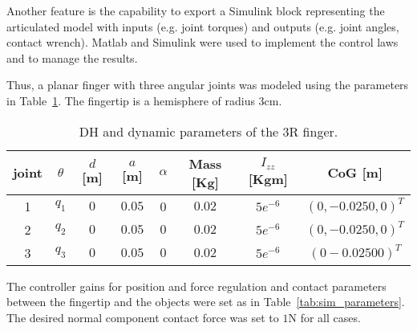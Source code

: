 Another feature is the capability to export a Simulink block representing the articulated model with inputs (e.g. joint torques) and outputs (e.g. joint angles, contact wrench). Matlab and Simulink were used to implement the control laws and to manage the results.

Thus, a planar finger with three angular joints was modeled using the parameters in Table~\ref{tab:3R}. The fingertip is a hemisphere of radius $3$cm.

\begin{table}
\centering
\begin{tabular}{cccccccc}
    \toprule
    \textbf{joint} & $\theta$ & $d$ [m] & $a$ [m] & $\alpha$ & \textbf{Mass [Kg]} & $I_{zz}$ [Kgm] & \textbf{CoG [m]}\\
    \toprule
    1 & $q_1$ & $0$ & $0.05$ & 0 & $0.02$ & $5e^{-6}$ & $(0, -0.0250, 0)^{T}$\\
    \midrule
    2 & $q_2$ & $0$ & $0.05$ & $0$ & $0.02$ & $5e^{-6}$ & $(0, -0.0250, 0)^{T}$\\
    \midrule
    3 & $q_3$ & $0$ & $0.05$ & $0$ & $0.02$ & $5e^{-6}$ & $(0 -0.0250 0)^{T}$\\
    \bottomrule
\end{tabular}
\caption{DH and dynamic parameters of the 3R finger.}
\label{tab:3R}
\end{table}

The controller gains for position and force regulation and contact parameters between the fingertip and the objects were set as in Table~\ref{tab:sim_parameters}. The desired normal component contact force was set to $1$N for all cases.

\begin{figure}
\begin{floatrow}
\end{floatrow}
\end{figure}


